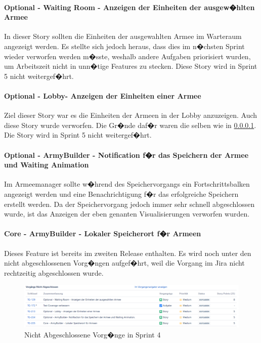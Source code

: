 \documentclass[12pt, titlepage]{scrartcl}
\begin{document}
				\paragraph{Optional - Waiting Room - Anzeigen der Einheiten der ausgew�hlten Armee}
				\label{OWaitingRoomAnzeigenEinheiten}
				In dieser Story sollten die Einheiten der ausgewahlten Armee im Warteraum angezeigt werden. Es stellte sich jedoch heraus, dass dies im n�chsten Sprint wieder verworfen werden m�sste, weshalb andere Aufgaben priorisiert wurden, um Arbeitszeit nicht in unn�tige Features zu stecken. Diese Story wird in Sprint 5 nicht weitergef�hrt.
				
				\paragraph{Optional - Lobby- Anzeigen der Einheiten einer Armee}
				Ziel dieser Story war es die Einheiten der Armeen in der Lobby anzuzeigen. Auch diese Story wurde verworfen. Die Gr�nde daf�r waren die selben wie in \ref{OWaitingRoomAnzeigenEinheiten}. Die Story wird in Sprint 5 nicht weitergef�hrt.
				
				\paragraph{Optional - ArmyBuilder - Notification f�r das Speichern der Armee und Waiting Animation}
				Im Armeemanager sollte w�hrend des Speichervorgangs ein Fortschrittsbalken angezeigt werden und eine Benachrichtigung f�r das erfolgreiche Speichern erstellt werden. Da der Speichervorgang jedoch immer sehr schnell abgeschlossen wurde, ist das Anzeigen der eben genanten Visualisierungen verworfen wurden.
				
				\paragraph{Core - ArmyBuilder - Lokaler Speicherort f�r Armeen}
				Dieses Feature ist bereits im zweiten Release enthalten. Es wird noch unter den nicht abgeschlossenen Vorg�ngen aufgef�hrt, weil die Vorgang im Jira nicht rechtzeitig abgeschlossen wurde.
			
				
			\begin{figure}[H] 
				\centering
				\includegraphics[width=1\textwidth]{Nicht_Abgeschlossene_Vorgaenge_Sprint_4.PNG}
				\caption{Nicht Abgeschlossene Vorg�nge in Sprint 4}
				\label{NichtAbgeschlosseneVorgaengeSprint4}
			\end{figure}
		
\end{document}
